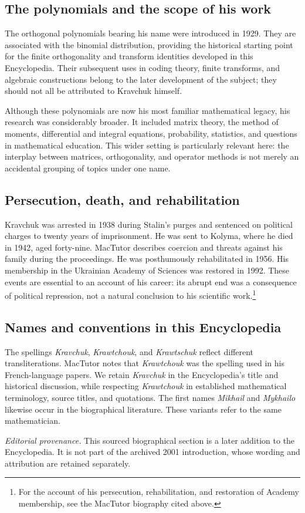 \subsection*{The polynomials and the scope of his work}
The orthogonal polynomials bearing his name were introduced in 1929.
They are associated with the binomial distribution, providing the
historical starting point for the finite orthogonality and transform
identities developed in this Encyclopedia. Their subsequent uses in
coding theory, finite transforms, and algebraic constructions belong to
the later development of the subject; they should not all be attributed
to Kravchuk himself.

Although these polynomials are now his most familiar mathematical legacy,
his research was considerably broader. It included matrix theory, the
method of moments, differential and integral equations, probability,
statistics, and questions in mathematical education. This wider setting
is particularly relevant here: the interplay between matrices,
orthogonality, and operator methods is not merely an accidental grouping
of topics under one name.

\subsection*{Persecution, death, and rehabilitation}
Kravchuk was arrested in 1938 during Stalin's purges and sentenced on
political charges to twenty years of imprisonment. He was sent to Kolyma,
where he died in 1942, aged forty-nine. MacTutor describes coercion and
threats against his family during the proceedings. He was posthumously
rehabilitated in 1956. His membership in the Ukrainian Academy of Sciences
was restored in 1992. These events are essential to an account of his
career: its abrupt end was a consequence of political repression, not a
natural conclusion to his scientific work.\footnote{For the account of
his persecution, rehabilitation, and restoration of Academy membership,
see the MacTutor biography cited above.}

\subsection*{Names and conventions in this Encyclopedia}
The spellings \emph{Kravchuk}, \emph{Krawtchouk}, and \emph{Krawtschuk}
reflect different transliterations. MacTutor notes that \emph{Krawtchouk}
was the spelling used in his French-language papers. We retain
\emph{Kravchuk} in the Encyclopedia's title and historical discussion,
while respecting \emph{Krawtchouk} in established mathematical terminology,
source titles, and quotations. The first names \emph{Mikhail} and
\emph{Mykhailo} likewise occur in the biographical literature. These
variants refer to the same mathematician.

\medskip
\noindent\emph{Editorial provenance.} This sourced biographical section
is a later addition to the Encyclopedia. It is not part of the archived
2001 introduction, whose wording and attribution are retained separately.
